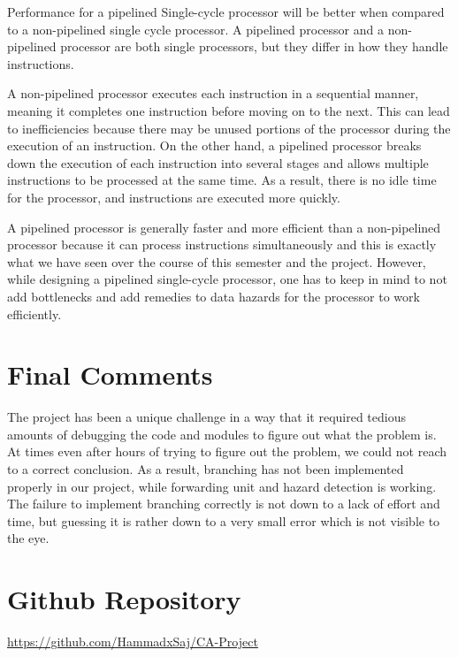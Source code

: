\documentclass{article}
\begin{document}
Performance for a pipelined Single-cycle processor will be better when compared to a non-pipelined single cycle processor. A pipelined processor and a non-pipelined processor are both single processors, but they differ in how they handle instructions.

A non-pipelined processor executes each instruction in a sequential manner, meaning it completes one instruction before moving on to the next. This can lead to inefficiencies because there may be unused portions of the processor during the execution of an instruction. On the other hand, a pipelined processor breaks down the execution of each instruction into several stages and allows multiple instructions to be processed at the same time. As a result, there is no idle time for the processor, and instructions are executed more quickly.

A pipelined processor is generally faster and more efficient than a non-pipelined processor because it can process instructions simultaneously and this is exactly what we have seen over the course of this semester and the project. However, while designing a pipelined single-cycle processor, one has to keep in mind to not add bottlenecks and add remedies to data hazards for the processor to work efficiently.

\section{Final Comments}
The project has been a unique challenge in a way that it required tedious amounts of debugging the code and modules to figure out what the problem is. At times even after hours of trying to figure out the problem, we could not reach to a correct conclusion. As a result, branching has not been implemented properly in our project, while forwarding unit and hazard detection is working. The failure to implement branching correctly is not down to a lack of effort and time, but guessing it is rather down to a very small error which is not visible to the eye. 


\section{Github Repository}

\href{https://github.com/HammadxSaj/CA-Project}{https://github.com/HammadxSaj/CA-Project}
\end{document}
